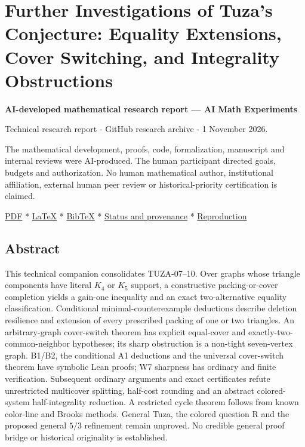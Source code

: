 \documentclass[11pt]{article}
\begin{document}
\section{Further Investigations of Tuza's Conjecture: Equality Extensions, Cover Switching, and Integrality Obstructions}\label{further-investigations-of-tuzas-conjecture-equality-extensions-cover-switching-and-integrality-obstructions}

\textbf{AI-developed mathematical research report --- AI Math Experiments}

Technical research report - GitHub research archive - 1 November 2026.

The mathematical development, proofs, code, formalization, manuscript and internal reviews were AI-produced. The human participant directed goals, budgets and authorization. No human mathematical author, institutional affiliation, external human peer review or historical-priority certification is claimed.

\href{https://github.com/pappa211/ai-math-experiments/blob/main/papers/tuza-further-investigations/main.pdf}{PDF} * \href{https://github.com/pappa211/ai-math-experiments/blob/main/papers/tuza-further-investigations/main.tex}{LaTeX} * \href{https://github.com/pappa211/ai-math-experiments/blob/main/papers/tuza-further-investigations/references.bib}{BibTeX} * \href{https://github.com/pappa211/ai-math-experiments/blob/main/STATUS_AND_PROVENANCE.md}{Status and provenance} * \href{https://github.com/pappa211/ai-math-experiments/blob/main/REPRODUCTION.md}{Reproduction}

\subsection{Abstract}\label{abstract}

This technical companion consolidates TUZA-07--10. Over graphs whose triangle components have literal \(K_4\) or \(K_5\) support, a constructive packing-or-cover completion yields a gain-one inequality and an exact two-alternative equality classification. Conditional minimal-counterexample deductions describe deletion resilience and extension of every prescribed packing of one or two triangles. An arbitrary-graph cover-switch theorem has explicit equal-cover and exactly-two-common-neighbor hypotheses; its sharp obstruction is a non-tight seven-vertex graph. B1/B2, the conditional A1 deductions and the universal cover-switch theorem have symbolic Lean proofs; W7 sharpness has ordinary and finite verification. Subsequent ordinary arguments and exact certificates refute unrestricted multicover splitting, half-cost rounding and an abstract colored-system half-integrality reduction. A restricted cycle theorem follows from known color-line and Brooks methods. General Tuza, the colored question R and the proposed general \(5/3\) refinement remain unproved. No credible general proof bridge or historical originality is established.
\end{document}

